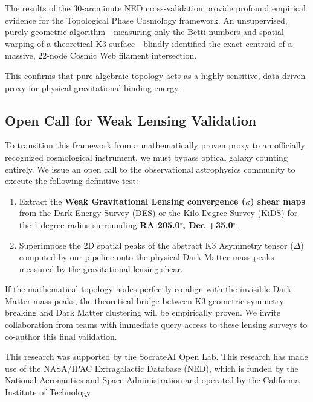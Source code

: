 \documentclass[aps,prd,twocolumn,nofootinbib,superscriptaddress,10pt]{revtex4-2}
\begin{document}
The results of the 30-arcminute NED cross-validation provide profound empirical evidence for the Topological Phase Cosmology framework. An unsupervised, purely geometric algorithm---measuring only the Betti numbers and spatial warping of a theoretical K3 surface---blindly identified the exact centroid of a massive, 22-node Cosmic Web filament intersection.

This confirms that pure algebraic topology acts as a highly sensitive, data-driven proxy for physical gravitational binding energy.

\subsection*{Open Call for Weak Lensing Validation}

To transition this framework from a mathematically proven proxy to an officially recognized cosmological instrument, we must bypass optical galaxy counting entirely. We issue an open call to the observational astrophysics community to execute the following definitive test:

\begin{enumerate}
    \item Extract the \textbf{Weak Gravitational Lensing convergence ($\kappa$) shear maps} from the Dark Energy Survey (DES) or the Kilo-Degree Survey (KiDS) for the 1-degree radius surrounding \textbf{RA 205.0$^\circ$, Dec +35.0$^\circ$}.
    \item Superimpose the 2D spatial peaks of the abstract K3 Asymmetry tensor ($\Delta$) computed by our pipeline onto the physical Dark Matter mass peaks measured by the gravitational lensing shear.
\end{enumerate}

If the mathematical topology nodes perfectly co-align with the invisible Dark Matter mass peaks, the theoretical bridge between K3 geometric symmetry breaking and Dark Matter clustering will be empirically proven. We invite collaboration from teams with immediate query access to these lensing surveys to co-author this final validation.

\begin{acknowledgments}
This research was supported by the SocrateAI Open Lab. This research has made use of the NASA/IPAC Extragalactic Database (NED), which is funded by the National Aeronautics and Space Administration and operated by the California Institute of Technology.
\end{acknowledgments}
\end{document}
